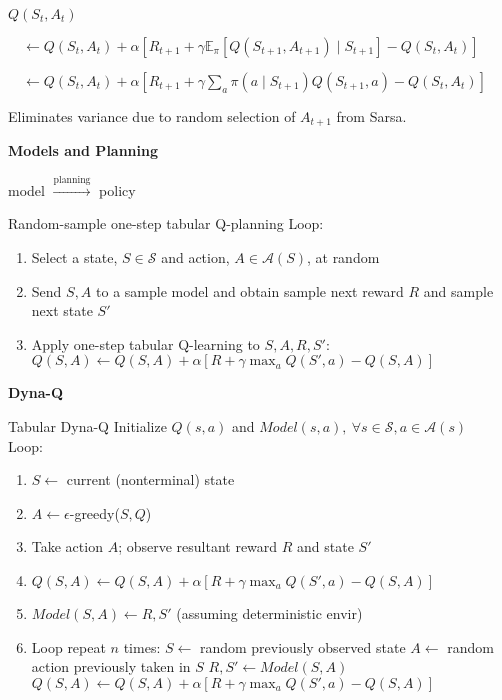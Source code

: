 \documentclass[twocolumn]{article}
\begin{document}
$Q(S_t, A_t)$

$\quad \leftarrow Q(S_t, A_t) + \alpha [R_{t+1} + \gamma \mathbb E_\pi [Q(S_{t+1}, A_{t+1}) \mid S_{t+1}] - Q(S_t, A_t)]$

$\quad\leftarrow Q(S_t, A_t) + \alpha[R_{t+1} + \gamma \sum_a \pi(a \mid S_{t+1}) Q(S_{t+1}, a) - Q(S_t, A_t)]$

Eliminates variance due to random selection of $A_{t+1}$ from Sarsa.


\newpage


\textbf{Models and Planning}

model $\xrightarrow{\text{planning}}$ policy

\begin{mydef}{Random-sample one-step tabular Q-planning}{}
    Loop:
    \begin{enumerate}
        \item Select a state, $S \in \mathcal S$ and action, $A \in \mathcal A(S)$, at random
        \item Send $S, A$ to a sample model and obtain sample next reward $R$ and sample next state $S'$
        \item Apply one-step tabular Q-learning to $S, A, R, S'$: \\
        $Q(S, A) \leftarrow Q(S, A) + \alpha [R + \gamma \max_a Q(S', a) - Q(S, A)]$
    \end{enumerate}
\end{mydef}

\dotfill

\textbf{Dyna-Q}

\begin{mydef}{Tabular Dyna-Q}{}
    Initialize $Q(s,a)$ and $Model(s,a),\ \forall s \in \mathcal S, a \in \mathcal A(s)$ \\
    Loop:
    \begin{enumerate}
        \item $S \leftarrow$ current (nonterminal) state
        \item $A \leftarrow \epsilon$-greedy($S,Q$)
        \item Take action $A$; observe resultant reward $R$ and state $S'$
        \item $Q(S,A) \leftarrow Q(S,A) + \alpha[R + \gamma \max_a Q(S',a) - Q(S, A)]$
        \item $Model(S,A) \leftarrow R, S'$ (assuming deterministic envir)
        \item Loop repeat $n$ times:
        \subitem$S \leftarrow$ random previously observed state
        \subitem$A \leftarrow$ random action previously taken in $S$
        \subitem$R,S' \leftarrow Model(S,A)$
        \subitem$Q(S,A) \leftarrow Q(S,A) + \alpha [R + \gamma \max_a Q(S', a) - Q(S,A)]$
    \end{enumerate}
\end{mydef}
\end{document}

